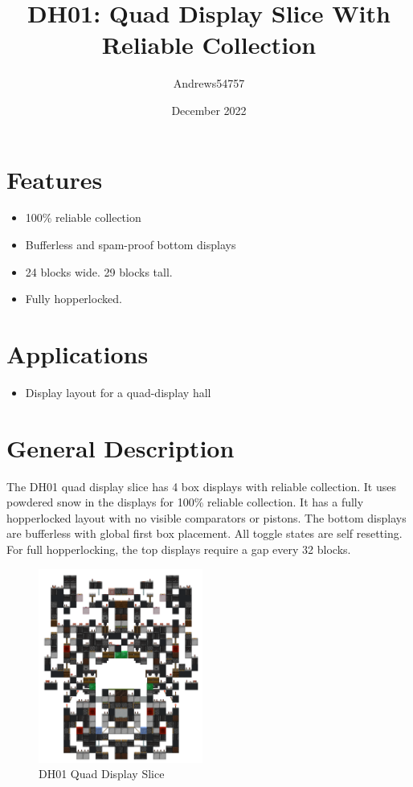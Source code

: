 \documentclass[10pt]{datasheet}
\title{DH01: Quad Display Slice With Reliable Collection}
\author{Andrews54757}
\date{December 2022}
\begin{document}
\maketitle

\section{Features}

\begin{itemize}
\item{100\% reliable collection}
\item{Bufferless and spam-proof bottom displays}
\item{24 blocks wide. 29 blocks tall.}
\item{Fully hopperlocked.}
\end{itemize}

\section{Applications}

\begin{itemize}
\item{Display layout for a quad-display hall}
\end{itemize}

\section{General Description}
The DH01 quad display slice has 4 box displays with reliable collection. It uses powdered snow in the displays for 100\% reliable collection. It has a fully hopperlocked layout with no visible comparators or pistons. The bottom displays are bufferless with global first box placement. All toggle states are self resetting. For full hopperlocking, the top displays require a gap every 32 blocks.
\vfill\break

\begin{figure}[h]
    \centering
    \includegraphics[width=0.48\textwidth]{slice2.png}
    \caption{\centering DH01 Quad Display Slice}
\end{figure}
\end{document}
